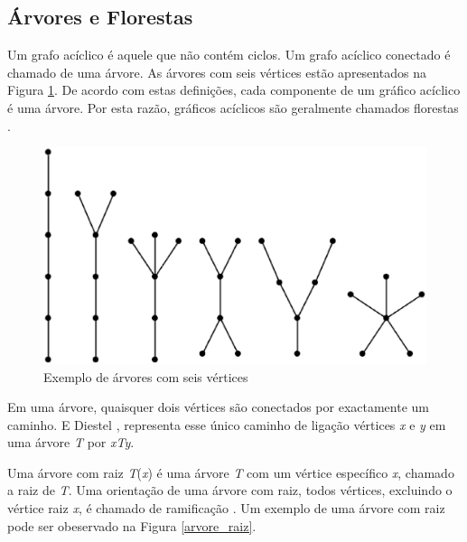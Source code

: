 \subsection{Árvores e Florestas}

Um grafo acíclico é aquele que não contém ciclos. Um grafo acíclico conectado é chamado de uma árvore. As árvores com seis vértices estão apresentados na Figura \ref{arvores_seis_vertices}. De acordo com estas definições, cada componente de um gráfico acíclico é uma árvore. Por esta razão, gráficos acíclicos são geralmente chamados florestas \cite{Bondy:2007}.

\begin{figure}[!h]
	\centering
	\includegraphics[scale=0.2]{figuras/capitulo2/arvores_seis_vertices.eps}
	\caption{Exemplo de árvores com seis vértices}
	\label{arvores_seis_vertices}
\end{figure}

Em uma árvore, quaisquer dois vértices são conectados por exactamente um caminho. E Diestel \cite{Diestel:1997}, representa esse único caminho de ligação vértices \textit{x} e \textit{y} em uma árvore \textit{T} por \textit{xTy}.

Uma árvore com raiz \textit{T}(\textit{x}) é uma árvore \textit{T} com um vértice específico \textit{x}, chamado a raiz de \textit{T}. Uma orientação de uma árvore com raiz, todos vértices, excluindo o vértice raiz \textit{x}, é chamado de ramificação \cite{Bondy:2007}. Um exemplo de uma árvore com raiz pode ser obeservado na Figura \ref{arvore_raiz}.

